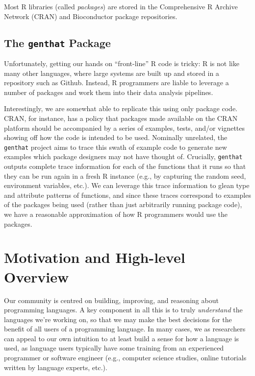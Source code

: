 Most R libraries (called \textit{packages}) are stored in the Comprehensive R Archive Network (CRAN) and Bioconductor package repositories.


%
%
%
%
\subsection{The \texttt{genthat} Package}

Unfortunately, getting our hands on ``front-line'' R code is tricky:
R is not like many other languages, where large systems are built up and stored in a repository such as Github.
Instead, R programmers are liable to leverage a number of packages and work them into their data analysis pipelines.

Interestingly, we are somewhat able to replicate this using only package code.
CRAN, for instance, has a policy that packages made available on the CRAN platform should be accompanied by a series of examples, tests, and/or vignettes showing off how the code is intended to be used.
Nominally unrelated, the {\tt genthat} project aims to trace this swath of example code to generate new examples which package designers may not have thought of.
Crucially, {\tt genthat} outputs complete trace information for each of the functions that it runs so that they can be run again in a fresh R instance (e.g., by capturing the random seed, environment variables, etc.).
We can leverage this trace information to glean type and attribute patterns of functions, and since these traces correspond to examples of the packages being used (rather than just arbitrarily running package code), we have a reasonable approximation of how R programmers would use the packages.




%
%
%
%
%
%
\section{Motivation and High-level Overview}

Our community is centred on building, improving, and reasoning about programming languages.
A key component in all this is to truly \textit{understand} the languages we're working on, so that we may make the best decisions for the benefit of all users of a programming language.
In many cases, we as researchers can appeal to our own intuition to at least build a sense for how a language is used, as language users typically have some training from an experienced programmer or software engineer (e.g., computer science studies, online tutorials written by language experts, etc.).

